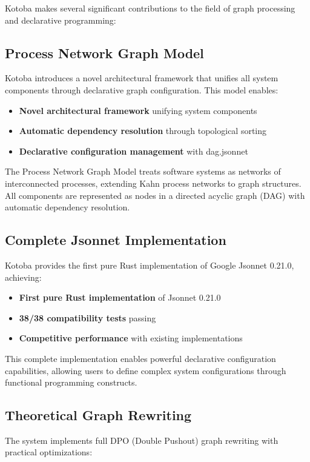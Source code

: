 \documentclass[11pt,a4paper]{article}
\begin{document}
Kotoba makes several significant contributions to the field of graph processing and declarative programming:

\subsection{Process Network Graph Model}
Kotoba introduces a novel architectural framework that unifies all system components through declarative graph configuration. This model enables:

\begin{itemize}
\item \textbf{Novel architectural framework} unifying system components
\item \textbf{Automatic dependency resolution} through topological sorting
\item \textbf{Declarative configuration management} with dag.jsonnet
\end{itemize}

The Process Network Graph Model treats software systems as networks of interconnected processes, extending Kahn process networks to graph structures. All components are represented as nodes in a directed acyclic graph (DAG) with automatic dependency resolution.

\subsection{Complete Jsonnet Implementation}
Kotoba provides the first pure Rust implementation of Google Jsonnet 0.21.0, achieving:

\begin{itemize}
\item \textbf{First pure Rust implementation} of Jsonnet 0.21.0
\item \textbf{38/38 compatibility tests} passing
\item \textbf{Competitive performance} with existing implementations
\end{itemize}

This complete implementation enables powerful declarative configuration capabilities, allowing users to define complex system configurations through functional programming constructs.

\subsection{Theoretical Graph Rewriting}
The system implements full DPO (Double Pushout) graph rewriting with practical optimizations:
\end{document}
